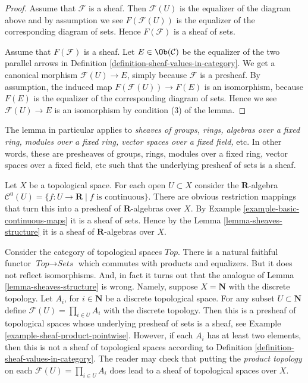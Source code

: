 \begin{proof}
Assume that $\mathcal{F}$ is a sheaf. Then
$\mathcal{F}(U)$ is the equalizer of the diagram
above and by assumption we see $F(\mathcal{F}(U))$
is the equalizer of the corresponding diagram
of sets. Hence $F(\mathcal{F})$ is a sheaf of sets.

\medskip\noindent
Assume that $F(\mathcal{F})$ is a sheaf.
Let $E \in \Ob(\mathcal{C})$ be the
equalizer of the two parallel arrows in
Definition \ref{definition-sheaf-values-in-category}.
We get a canonical morphism $\mathcal{F}(U) \to E$,
simply because $\mathcal{F}$ is a presheaf.
By assumption, the induced map $F(\mathcal{F}(U)) \to F(E)$
is an isomorphism, because $F(E)$ is the equalizer
of the corresponding diagram of sets. Hence we
see $\mathcal{F}(U) \to E$ is an isomorphism
by condition (3) of the lemma.
\end{proof}

\noindent
The lemma in particular applies to
{\it sheaves of groups, rings, algebras over a fixed ring, modules
over a fixed ring, vector spaces over a fixed field, } etc.
In other words, these are presheaves of groups, rings,
modules over a fixed ring, vector spaces over a fixed field, etc
such that the underlying presheaf of sets is a sheaf.

\begin{example}
\label{example-C0-sheaf-rings}
Let $X$ be a topological space. For each open $U \subset X$ consider
the $\mathbf{R}$-algebra
$\mathcal{C}^{0}(U) = \{ f : U \to \mathbf{R} \mid f\text{ is continuous}\}$.
There are obvious restriction mappings that turn this into a
presheaf of $\mathbf{R}$-algebras over $X$.
By Example \ref{example-basic-continuous-maps} it is a sheaf of sets.
Hence by the Lemma \ref{lemma-sheaves-structure} it is a sheaf of
$\mathbf{R}$-algebras over $X$.
\end{example}

\begin{example}
\label{example-sheaves-topological-spaces}
Consider the category of topological spaces $\textit{Top}$.
There is a natural faithful functor $\textit{Top} \to \textit{Sets}$
which commutes with products and equalizers. But it does
not reflect isomorphisms. And, in fact it turns out that
the analogue of Lemma \ref{lemma-sheaves-structure} is wrong.
Namely, suppose $X = \mathbf{N}$ with the discrete
topology. Let $A_i$, for $i \in \mathbf{N}$ be a discrete
topological space. For any subset $U \subset \mathbf{N}$
define $\mathcal{F}(U) = \prod_{i\in U} A_i$ with the
discrete topology. Then this is a presheaf of topological
spaces whose underlying presheaf of sets is a sheaf, see
Example \ref{example-sheaf-product-pointwise}.
However, if each $A_i$ has at least two elements, then
this is not a sheaf of topological spaces
according to Definition \ref{definition-sheaf-values-in-category}.
The reader may check that putting the {\it product topology} on
each $\mathcal{F}(U) = \prod_{i\in U} A_i$ does lead to a sheaf
of topological spaces over $X$.
\end{example}


